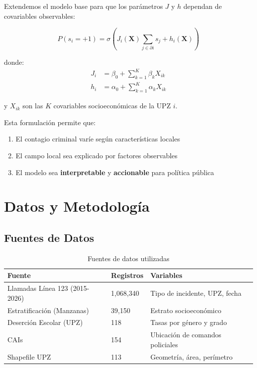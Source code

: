\documentclass[12pt,a4paper]{article}
\begin{document}
Extendemos el modelo base para que los parámetros $J$ y $h$ dependan de covariables observables:

\begin{equation}\label{eq:sociofisico}
P(s_i=+1) = \sigma\left(J_i(\mathbf{X}) \sum_{j \in \partial i} s_j + h_i(\mathbf{X})\right)
\end{equation}

donde:
\begin{align}
J_i &= \beta_0 + \sum_{k=1}^{K} \beta_k X_{ik} \label{eq:J_modulado} \\
h_i &= \alpha_0 + \sum_{k=1}^{K} \alpha_k X_{ik} \label{eq:h_explicado}
\end{align}

y $X_{ik}$ son las $K$ covariables socioeconómicas de la UPZ $i$.

Esta formulación permite que:
\begin{enumerate}[label=\alph*)]
    \item El contagio criminal varíe según características locales
    \item El campo local sea explicado por factores observables
    \item El modelo sea \textbf{interpretable} y \textbf{accionable} para política pública
\end{enumerate}

\section{Datos y Metodología}

\subsection{Fuentes de Datos}

\begin{table}[H]
\centering
\caption{Fuentes de datos utilizadas}
\label{tab:fuentes}
\begin{tabular}{@{}lll@{}}
\toprule
\textbf{Fuente} & \textbf{Registros} & \textbf{Variables} \\
\midrule
Llamadas Línea 123 (2015-2026) & 1,068,340 & Tipo de incidente, UPZ, fecha \\
Estratificación (Manzanas) & 39,150 & Estrato socioeconómico \\
Deserción Escolar (UPZ) & 118 & Tasas por género y grado \\
CAIs & 154 & Ubicación de comandos policiales \\
Shapefile UPZ & 113 & Geometría, área, perímetro \\
\bottomrule
\end{tabular}
\end{table}
\end{document}
